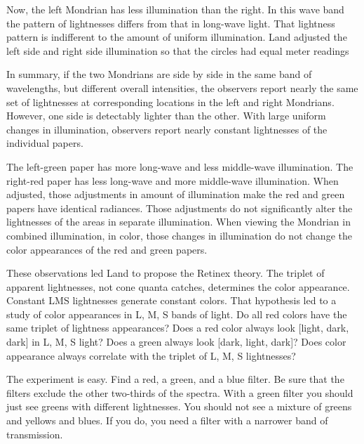 
Now, the left Mondrian has less illumination than the right. In this wave band the pattern of lightnesses differs from that in long-wave light. That lightness pattern is indifferent to the amount of uniform illumination. Land adjusted the left side and right side illumination so that the circles had equal meter readings

In summary, if the two Mondrians are side by side in the same band of wavelengths, but different overall intensities, the observers report nearly the same set of lightnesses at corresponding locations in the left and right Mondrians. However, one side is detectably lighter than the other. With large uniform changes in illumination, observers report nearly constant lightnesses of the individual papers.

The left-green paper has more long-wave and less middle-wave illumination. The right-red paper has less long-wave and more middle-wave illumination. When adjusted, those adjustments in amount of illumination make the red and green papers have identical radiances. Those adjustments do not significantly alter the lightnesses of the areas in separate illumination. When viewing the Mondrian in combined illumination, in color, those changes in illumination do not change the color appearances of the red and green papers.


These observations led Land to propose the Retinex theory. The triplet of apparent lightnesses, not cone quanta catches, determines the color appearance. Constant LMS lightnesses generate constant colors. That hypothesis led to a study of color appearances in L, M, S bands of light. Do all red colors have the same triplet of lightness appearances? Does a red color always look [light, dark, dark] in L, M, S light? Does a green always look [dark, light, dark]? Does color appearance always correlate with the triplet of L, M, S lightnesses?

The experiment is easy. Find a red, a green, and a blue filter. Be sure that the filters exclude the other two-thirds of the spectra. With a green filter you should just see greens with different lightnesses. You should not see a mixture of greens and yellows and blues. If you do, you need a filter with a narrower band of transmission.

